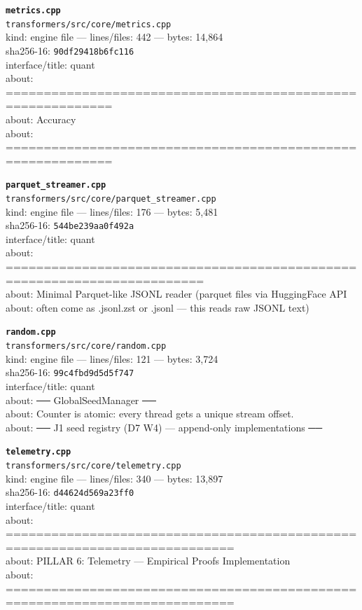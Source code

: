 \noindent\textbf{\texttt{metrics.cpp}}\\
\texttt{transformers/src/core/metrics.cpp}\\
kind: engine file --- lines/files: 442 --- bytes: 14,864\\
sha256-16: \texttt{90df29418b6fc116}\\
interface/title: quant\\
about: ============================================================\\
about: Accuracy\\
about: ============================================================\\
\vspace*{6.0pt}

\noindent\textbf{\texttt{parquet\_streamer.cpp}}\\
\texttt{transformers/src/core/parquet\_streamer.cpp}\\
kind: engine file --- lines/files: 176 --- bytes: 5,481\\
sha256-16: \texttt{544be239aa0f492a}\\
interface/title: quant\\
about: ========================================================================\\
about: Minimal Parquet-like JSONL reader (parquet files via HuggingFace API\\
about: often come as .jsonl.zst or .jsonl — this reads raw JSONL text)\\
\vspace*{6.0pt}

\noindent\textbf{\texttt{random.cpp}}\\
\texttt{transformers/src/core/random.cpp}\\
kind: engine file --- lines/files: 121 --- bytes: 3,724\\
sha256-16: \texttt{99c4fbd9d5d5f747}\\
interface/title: quant\\
about: ── GlobalSeedManager ──\\
about: Counter is atomic: every thread gets a unique stream offset.\\
about: ── J1 seed registry (D7 W4) — append-only implementations ──\\
\vspace*{6.0pt}
\newpage

\noindent\textbf{\texttt{telemetry.cpp}}\\
\texttt{transformers/src/core/telemetry.cpp}\\
kind: engine file --- lines/files: 340 --- bytes: 13,897\\
sha256-16: \texttt{d44624d569a23ff0}\\
interface/title: quant\\
about: ============================================================================\\
about: PILLAR 6: Telemetry — Empirical Proofs Implementation\\
about: ============================================================================\\
\vspace*{6.0pt}


